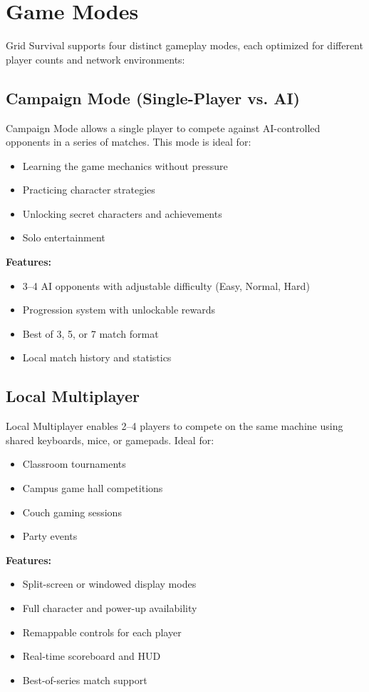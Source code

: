 \documentclass[12pt,a4paper]{article}
\begin{document}
\section{Game Modes}

Grid Survival supports four distinct gameplay modes, each optimized for different player counts and network environments:

\subsection{Campaign Mode (Single-Player vs. AI)}

Campaign Mode allows a single player to compete against AI-controlled opponents in a series of matches. This mode is ideal for:
\begin{itemize}
    \item Learning the game mechanics without pressure
    \item Practicing character strategies
    \item Unlocking secret characters and achievements
    \item Solo entertainment
\end{itemize}

\textbf{Features:}
\begin{itemize}
    \item 3–4 AI opponents with adjustable difficulty (Easy, Normal, Hard)
    \item Progression system with unlockable rewards
    \item Best of 3, 5, or 7 match format
    \item Local match history and statistics
\end{itemize}

\subsection{Local Multiplayer}

Local Multiplayer enables 2–4 players to compete on the same machine using shared keyboards, mice, or gamepads. Ideal for:
\begin{itemize}
    \item Classroom tournaments
    \item Campus game hall competitions
    \item Couch gaming sessions
    \item Party events
\end{itemize}

\textbf{Features:}
\begin{itemize}
    \item Split-screen or windowed display modes
    \item Full character and power-up availability
    \item Remappable controls for each player
    \item Real-time scoreboard and HUD
    \item Best-of-series match support
\end{itemize}
\end{document}
